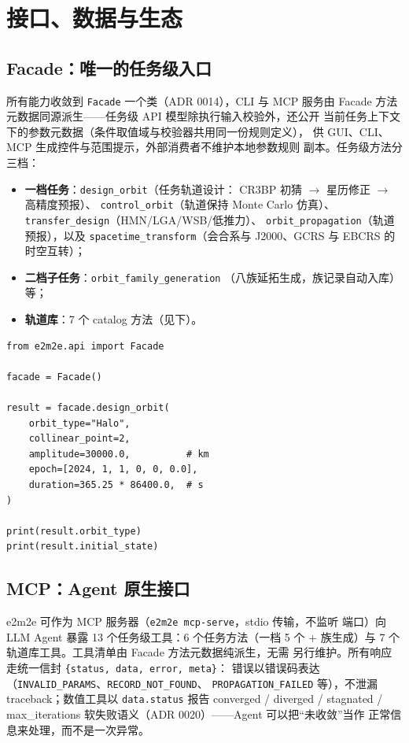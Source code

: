 \section{接口、数据与生态}
\label{sec:interfaces}

\subsection{Facade：唯一的任务级入口}

所有能力收敛到 \texttt{Facade} 一个类（ADR 0014），CLI 与 MCP 服务由
Facade 方法元数据同源派生——任务级 API 模型除执行输入校验外，还公开
当前任务上下文下的参数元数据（条件取值域与校验器共用同一份规则定义），
供 GUI、CLI、MCP 生成控件与范围提示，外部消费者不维护本地参数规则
副本。任务级方法分三档：

\begin{itemize}
  \item \textbf{一档任务}：\texttt{design\_orbit}（任务轨道设计：
        CR3BP 初猜 $\to$ 星历修正 $\to$ 高精度预报）、
        \texttt{control\_orbit}（轨道保持 Monte Carlo 仿真）、
        \texttt{transfer\_design}（HMN/LGA/WSB/低推力）、
        \texttt{orbit\_propagation}（轨道预报），以及
        \texttt{spacetime\_transform}（会合系与 J2000、GCRS 与
        EBCRS 的时空互转）；
  \item \textbf{二档子任务}：\texttt{orbit\_family\_generation}
        （八族延拓生成，族记录自动入库）等；
  \item \textbf{轨道库}：7 个 catalog 方法（见下）。
\end{itemize}

\begin{lstlisting}[caption={设计一条地月 L2 Halo 轨道（examples/main\_design.py）},label=lst:quickstart]
from e2m2e.api import Facade

facade = Facade()

result = facade.design_orbit(
    orbit_type="Halo",
    collinear_point=2,
    amplitude=30000.0,          # km
    epoch=[2024, 1, 1, 0, 0, 0.0],
    duration=365.25 * 86400.0,  # s
)

print(result.orbit_type)
print(result.initial_state)
\end{lstlisting}

\subsection{MCP：Agent 原生接口}

e2m2e 可作为 MCP 服务器（\texttt{e2m2e mcp-serve}，stdio 传输，不监听
端口）向 LLM Agent 暴露 13 个任务级工具：6 个任务方法（一档 5 个 +
族生成）与 7 个轨道库工具。工具清单由 Facade 方法元数据纯派生，无需
另行维护。所有响应走统一信封 \texttt{\{status, data, error, meta\}}：
错误以错误码表达（\texttt{INVALID\_PARAMS}、\texttt{RECORD\_NOT\_FOUND}、
\texttt{PROPAGATION\_FAILED} 等），不泄漏 traceback；数值工具以
\texttt{data.status} 报告 converged / diverged / stagnated /
max\_iterations 软失败语义（ADR 0020）——Agent 可以把“未收敛”当作
正常信息来处理，而不是一次异常。

